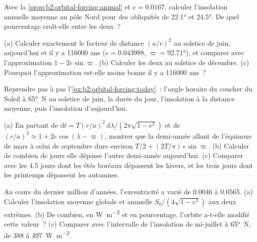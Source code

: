 \begin{exercise}[$\star$]\label{exo:b2:orbital-forcing:4}
Avec la \cref{prop:b2:orbital-forcing:annual} et $e = 0.0167$, calculer l'insolation annuelle moyenne au
pôle Nord pour des obliquités de \ang{22.1} et \ang{24.5}. De quel pourcentage croît-elle entre
les deux~?
\end{exercise}

\begin{exercise}[$\star\star$]\label{exo:b2:orbital-forcing:5}
(a) Calculer exactement le facteur de distance $(a/r)^2$ au solstice de juin, aujourd'hui et il y a \num{116000}
ans ($e = 0.043988$, $\varpi = \ang{92.71}$), et comparer avec l'approximation $1 -
2e\sin\varpi$. (b) Calculer les deux au solstice de décembre. (c) Pourquoi l'approximation est-elle moins bonne il y a
\num{116000} ans~?
\end{exercise}

\begin{exercise}[$\star\star$]\label{exo:b2:orbital-forcing:6}
Reprendre pas à pas l'\cref{ex:b2:orbital-forcing:today}~: l'angle horaire du coucher du Soleil à \ang{65}~N
au solstice de juin, la durée du jour, l'insolation à la distance
moyenne, puis l'insolation d'aujourd'hui.
\end{exercise}

\begin{exercise}[$\star\star$]\label{exo:b2:orbital-forcing:7}
(a) En partant de $\mathrm dt = T(r/a)^2\,\mathrm d\lambda/(2\pi\sqrt{1 - e^2})$ et de $(r/a)^2 \approx 1 +
2e\cos(\lambda - \varpi)$, montrer que la demi-année allant de l'équinoxe de mars à celui de septembre dure environ
$T/2 + (2T/\pi)\,e\sin\varpi$. (b) Calculer de combien de jours elle dépasse l'autre demi-année
aujourd'hui. (c) Comparer avec les 4.5 jours dont les étés boréaux dépassent les hivers, et les trois jours dont
les printemps dépassent les automnes.
\end{exercise}

\begin{exercise}[$\star\star$]\label{exo:b2:orbital-forcing:8}
Au cours du dernier million d'années, l'excentricité a varié de \num{0.0046} à \num{0.0565}. (a) Calculer
l'insolation moyenne globale et annuelle $S_0/(4\sqrt{1 - e^2})$ aux deux extrêmes. (b) De combien, en
\unit{W.m^{-2}} et en pourcentage, l'orbite a-t-elle modifié cette valeur~?
(c) Comparer avec l'intervalle de l'insolation de mi-juillet à \ang{65}~N, de 388 à \qty{497}{W.m^{-2}}.
\end{exercise}

